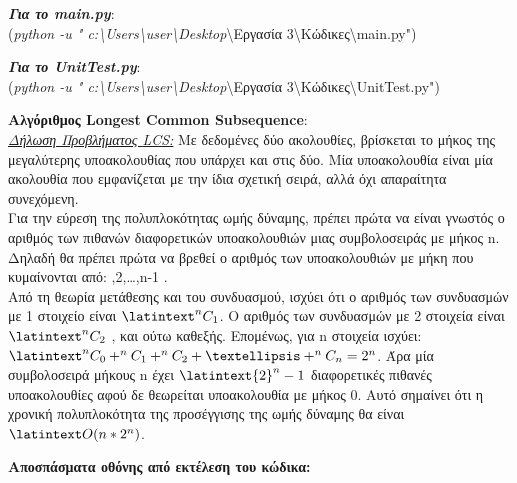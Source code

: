 \documentclass[a4paper,12pt]{report}
\newcommand{\lat} {\latintext}
\begin{document}
	\vspace{0.3cm}
	
	\textbf {\emph {Για το {\lat main.py}}}:
	\\({\textit {\lat python -u " c:{\textbackslash Users}{\textbackslash  user}{\textbackslash Desktop}}{\textbackslash Εργασία 3}{\textbackslash Κώδικες}{\textbackslash {\lat main.py"}}})
	
	\vspace{0.3cm}
	
	\textbf {\emph {Για το {\lat UnitTest.py}}}:
	\\({\textit {\lat python -u " c:{\textbackslash Users}{\textbackslash  user}{\textbackslash Desktop}}{\textbackslash Εργασία 3}{\textbackslash Κώδικες}{\textbackslash {\lat UnitTest.py"}}})
	
	\vspace{0.7cm}
	
	
	\textbf{Αλγόριθμος {\lat Longest Common Subsequence}}:
	\\ \underline {\emph {Δήλωση Προβλήματος {\lat LCS}:}}  Με δεδομένες δύο ακολουθίες, βρίσκεται το μήκος της μεγαλύτερης υποακολουθίας που υπάρχει και στις δύο. Μία υποακολουθία είναι μία ακολουθία που εμφανίζεται με την ίδια σχετική σειρά, αλλά όχι απαραίτητα συνεχόμενη.
	\vspace{0.1cm}
	\\Για την εύρεση της πολυπλοκότητας ωμής δύναμης, πρέπει πρώτα να είναι γνωστός ο αριθμός των πιθανών διαφορετικών υποακολουθιών μιας συμβολοσειράς με μήκος {\lat n}. Δηλαδή θα πρέπει πρώτα να βρεθεί ο αριθμός των υποακολουθιών με μήκη που κυμαίνονται από: {\lat 1,2,…,n-1} .
	\vspace{0.2cm} 
	\\Από τη θεωρία μετάθεσης και του συνδυασμού, ισχύει ότι ο αριθμός των συνδυασμών με 1 στοιχείο είναι ${\lat ^{n} {C}_{1}}$. Ο αριθμός των συνδυασμών με 2 στοιχεία είναι ${\lat ^{n} {C}_{2}}$ , και ούτω καθεξής. Επομένως, για {\lat n} στοιχεία ισχύει: ${\lat ^{n} {C}_{0} + ^{n} {C}_{1} + ^{n} {C}_{2} + … + ^{n} {C}_{n}  = {2}^{n}}$. Άρα μία συμβολοσειρά μήκους n έχει ${\lat {2}^{n} - 1}$ διαφορετικές πιθανές υποακολουθίες αφού δε θεωρείται υποακολουθία με μήκος 0. Αυτό σημαίνει ότι η χρονική πολυπλοκότητα της προσέγγισης της ωμής δύναμης θα είναι ${\lat O(n * {2}^{n} )}$.                                                   
	
	
	\vspace{0.9cm}
	
	
	\textbf{Αποσπάσματα οθόνης από εκτέλεση του κώδικα:}
	
\end{document}
